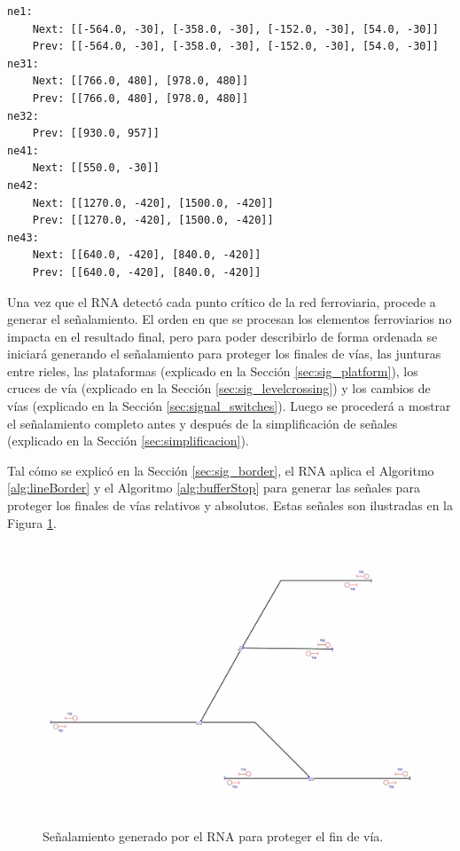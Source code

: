 	\begin{lstlisting}[language = {}, caption = SafePoints.RNA, label = {lst:EJ7_5}]
ne1:
	Next: [[-564.0, -30], [-358.0, -30], [-152.0, -30], [54.0, -30]]
	Prev: [[-564.0, -30], [-358.0, -30], [-152.0, -30], [54.0, -30]]
ne31:
	Next: [[766.0, 480], [978.0, 480]]
	Prev: [[766.0, 480], [978.0, 480]]
ne32:
	Prev: [[930.0, 957]]
ne41:
	Next: [[550.0, -30]]
ne42:
	Next: [[1270.0, -420], [1500.0, -420]]
	Prev: [[1270.0, -420], [1500.0, -420]]
ne43:
	Next: [[640.0, -420], [840.0, -420]]
	Prev: [[640.0, -420], [840.0, -420]]
	\end{lstlisting}	
	
	Una vez que el RNA detectó cada punto crítico de la red ferroviaria, procede a generar el señalamiento. El orden en que se procesan los elementos ferroviarios no impacta en el resultado final, pero para poder describirlo de forma ordenada se iniciará generando el señalamiento para proteger los finales de vías, las junturas entre rieles, las plataformas (explicado en la Sección \ref{sec:sig_platform}), los cruces de vía (explicado en la Sección \ref{sec:sig_levelcrossing}) y los cambios de vías (explicado en la Sección \ref{sec:signal_switches}). Luego se procederá a mostrar el señalamiento completo antes y después de la simplificación de señales (explicado en la Sección \ref{sec:simplificacion}). 
	
	Tal cómo se explicó en la Sección \ref{sec:sig_border}, el RNA aplica el Algoritmo \ref{alg:lineBorder} y el Algoritmo \ref{alg:bufferStop} para generar las señales para proteger los finales de vías relativos y absolutos. Estas señales son ilustradas en la Figura \ref{fig:EJ7_3}.
	
	\begin{figure}[H]
		\centering
		\includegraphics[width=1\textwidth]{resultados-obtenidos/ejemplo7/images/7_step1.png}
		\centering\caption{Señalamiento generado por el RNA para proteger el fin de vía.}
		\label{fig:EJ7_3}
	\end{figure}
	
